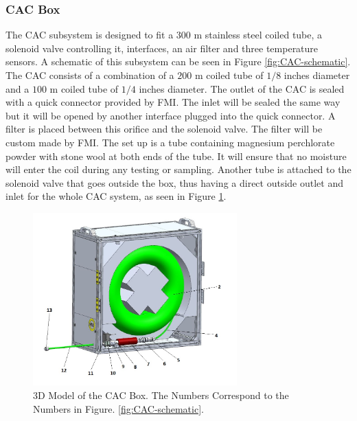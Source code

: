 \subsubsection{CAC Box}

The CAC subsystem is designed to fit a $300$ m stainless steel coiled tube, a solenoid valve controlling it, interfaces, an air filter and three temperature sensors. A schematic of this subsystem can be seen in Figure \ref{fig:CAC-schematic}. The CAC consists of a combination of a $200$ m coiled tube of $1/8$ inches diameter and a $100$ m coiled tube of $1/4$ inches diameter. The outlet of the CAC is sealed with a quick connector provided by FMI. The inlet will be sealed the same way but it will be opened by another interface plugged into the quick connector. A filter is placed between this orifice and the solenoid valve. The filter will be custom made by FMI. The set up is a tube containing magnesium perchlorate powder with stone wool at both ends of the tube. It will ensure that no moisture will enter the coil during any testing or sampling. Another tube is attached to the solenoid valve that goes outside the box, thus having a direct outside outlet and inlet for the whole CAC system, as seen in Figure \ref{fig:CAC-cad-model}.


\begin{figure}[H]
    \centering
    \includegraphics[width=0.7\textwidth]{4-experiment-design/img/Mechanical/CAC_interior_labels.jpg}
    \caption{3D Model of the CAC Box. The Numbers Correspond to the Numbers in Figure. \ref{fig:CAC-schematic}.}
    \label{fig:CAC-cad-model}
\end{figure}

